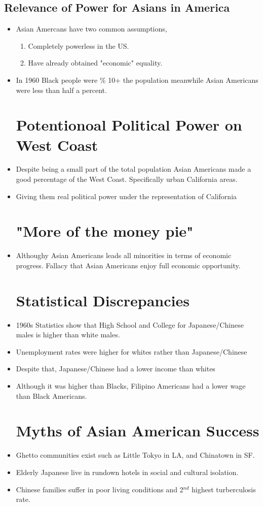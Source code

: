 \documentclass{article}
\begin{document}
\subsection{Relevance of Power for Asians in America}
\begin{itemize}
  \item Asian Amercans have two common assumptions,
    \begin{enumerate}
     \item Completely powerless in the US.
    \item Have already obtained "economic" equality.
    \end{enumerate}
  \item In 1960 Black people were \% 10+ the population meanwhile
    Asian Americans were less than half a percent.

  \section*{Potentionoal Political Power on West Coast}
  \item Despite being a small part of the total population
    Asian Americans made a good percentage of the West Coast.
    Specifically urban California areas.
  \item Giving them real political power
    under the representation of California
  \section*{"More of the money pie"}
  \item Althoughy Asian Americans leads all
    minorities in terms of economic progress.
    Fallacy that Asian Americans
    enjoy full economic opportunity. 
  \section*{Statistical Discrepancies}
\item 1960s Statistics show that High School and College for Japanese/Chinese
  males is higher than white males.
\item Unemployment rates were higher for whites rather than Japanese/Chinese
\item Despite that, Japanese/Chinese had a lower income than whites
\item Although it was higher than Blacks, Filipino Americans
  had a lower wage than Black Americans.

 \section*{Myths of Asian American Success}
\item Ghetto communities exist such as Little Tokyo
  in LA, and Chinatown in SF.
\item Elderly Japanese live in rundown hotels in social and 
  cultural isolation.
\item Chinese families suffer in poor living conditions
  and 2$^{nd}$ highest turberculosis rate.
\end{itemize}
\end{document}

